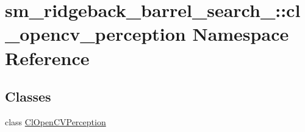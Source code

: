 \hypertarget{namespacesm__ridgeback__barrel__search__1_1_1cl__opencv__perception}{}\section{sm\+\_\+ridgeback\+\_\+barrel\+\_\+search\+\_\+:\+:cl\+\_\+opencv\+\_\+perception Namespace Reference}
\label{namespacesm__ridgeback__barrel__search__1_1_1cl__opencv__perception}
\subsection*{Classes}
\begin{DoxyCompactItemize}
\item 
class \hyperlink{classsm__ridgeback__barrel__search__1_1_1cl__opencv__perception_1_1ClOpenCVPerception}{Cl\+Open\+C\+V\+Perception}
\end{DoxyCompactItemize}
